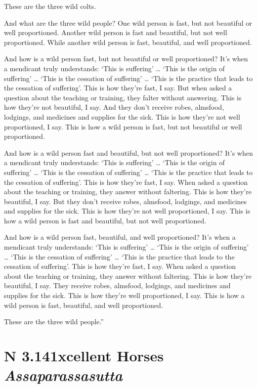\documentclass[12pt,openany]{book}%
\newcommand*{\suttatitleacronym}[1]{\smaller[2]{#1}\vspace*{.3em}}
\newcommand*{\suttatitletranslation}[1]{\linebreak{#1}}
\newcommand*{\suttatitleroot}[1]{\linebreak\smaller[2]\itshape{#1}}
\newcommand*{\tocacronym}[1]{\hspace*{-3.3em}{#1}\quad}
\newcommand*{\toctranslation}[1]{#1}
\newcommand*{\tocroot}[1]{(\textit{#1})}
\begin{document}
These are the three wild colts. 

And what are the three wild people? One wild person is fast, but not beautiful or well proportioned. Another wild person is fast and beautiful, but not well proportioned. While another wild person is fast, beautiful, and well proportioned. 

And how is a wild person fast, but not beautiful or well proportioned? It’s when a mendicant truly understands: ‘This is suffering’ … ‘This is the origin of suffering’ … ‘This is the cessation of suffering’ … ‘This is the practice that leads to the cessation of suffering’. This is how they’re fast, I say. But when asked a question about the teaching or training, they falter without answering. This is how they’re not beautiful, I say. And they don’t receive robes, almsfood, lodgings, and medicines and supplies for the sick. This is how they’re not well proportioned, I say. This is how a wild person is fast, but not beautiful or well proportioned. 

And how is a wild person fast and beautiful, but not well proportioned? It’s when a mendicant truly understands: ‘This is suffering’ … ‘This is the origin of suffering’ … ‘This is the cessation of suffering’ … ‘This is the practice that leads to the cessation of suffering’. This is how they’re fast, I say. When asked a question about the teaching or training, they answer without faltering. This is how they’re beautiful, I say. But they don’t receive robes, almsfood, lodgings, and medicines and supplies for the sick. This is how they’re not well proportioned, I say. This is how a wild person is fast and beautiful, but not well proportioned. 

And how is a wild person fast, beautiful, and well proportioned? It’s when a mendicant truly understands: ‘This is suffering’ … ‘This is the origin of suffering’ … ‘This is the cessation of suffering’ … ‘This is the practice that leads to the cessation of suffering’. This is how they’re fast, I say. When asked a question about the teaching or training, they answer without faltering. This is how they’re beautiful, I say. They receive robes, almsfood, lodgings, and medicines and supplies for the sick. This is how they’re well proportioned, I say. This is how a wild person is fast, beautiful, and well proportioned. 

These are the three wild people.” 

%
\section*{{\suttatitleacronym AN 3.141}{\suttatitletranslation Excellent Horses }{\suttatitleroot Assaparassasutta}}
\addcontentsline{toc}{section}{\tocacronym{AN 3.141} \toctranslation{Excellent Horses } \tocroot{Assaparassasutta}}
\end{document}
